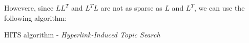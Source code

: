 Howevere, since $L L^T$ and $L^T L$ are not as sparse as $L$ and $L^T$, we can use the following algorithm:

\begin{algorithm}[H]
\SetAlgoLined
\DontPrintSemicolon
\caption{HITS algorithm - \textit{Hyperlink-Induced Topic Search}}
\end{algorithm}

